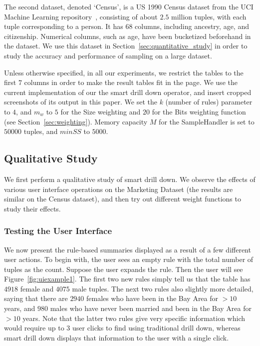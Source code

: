 \documentclass[10pt,journal,compsoc]{IEEEtran}
\begin{document}
The second dataset, denoted `Census', is a US 1990 Census dataset from the UCI Machine Learning repository~\cite{uciml},
consisting of about $2.5$ million tuples, with each tuple corresponding to a person. It has $68$ columns, including ancestry, age, and citizenship. Numerical columns, such as age, have been bucketized beforehand in the dataset. We use this dataset in Section~\ref{sec:quantitative_study} in order to study the accuracy and performance of sampling on a large dataset.

Unless otherwise specified, in all our experiments, we restrict the tables to the first $7$ columns in order to make the result tables fit in the page. We use the current implementation of our the smart drill down operator, and insert cropped screenshots of its output in this paper. 
We set the $k$ (number of rules) parameter to $4$, and $m_w$ to $5$ for the Size weighting and $20$ for the Bits weighting function (see Section~\ref{sec:weighting}). Memory capacity $M$ for the SampleHandler is set to $50000$ tuples, and $minSS$ to $5000$.


\subsection{Qualitative Study}\label{sec:exp_qualitative}
We first perform a qualitative study of smart drill down. We observe the effects of various user interface operations on the Marketing Dataset (the results are similar on the Census dataset), and then try out different weight functions to study their effects.
\subsubsection{Testing the User Interface}
We now present the rule-based summaries displayed as a result of a few different user actions.
To begin with, the user sees an empty rule with the total number of tuples as the count. Suppose the user expands the rule. Then the user will see Figure~\ref{fig:uiexample1}. The first two new rules simply tell us that the table has $4918$ female and $4075$ male tuples. The next two rules also slightly more detailed, saying that there are $2940$ females who have been in the Bay Area for $> 10$ years, and $980$ males who have never been married and been in the Bay Area for $> 10$ years. Note that the latter two rules give very specific information which would require up to $3$ user clicks to find using traditional drill down, whereas smart drill down displays that information to the user with a single click.
\end{document}
